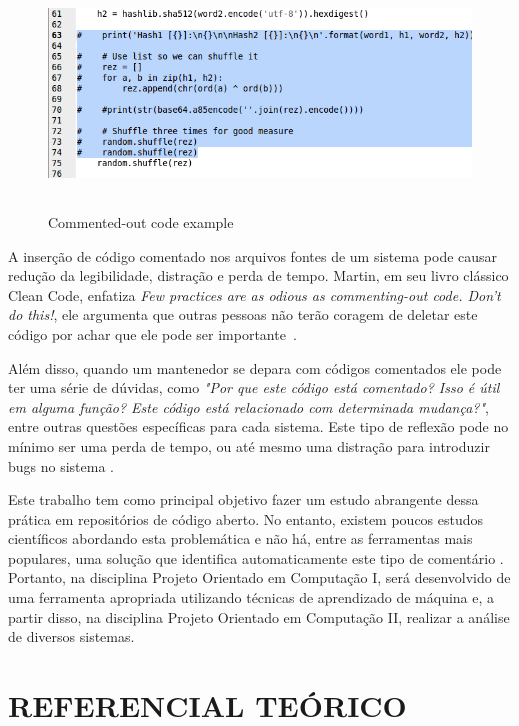 \documentclass{abnt}
\begin{document}
\begin{figure}[h!]
  \centering
  \includegraphics[height=2.4in,width=6.3in]{images/gcc06.png}
  \caption{Commented-out code example }
  \label{fig:commentExample}
\end{figure}


A inserção de código comentado nos arquivos fontes de um sistema pode causar
redução da legibilidade, distração e perda de tempo. Martin, em seu livro clássico
Clean Code, enfatiza \textit{Few practices are as odious as commenting-out code. 
Don’t do this!}, ele argumenta que outras pessoas não terão coragem de deletar 
este código por achar que ele pode ser importante~\cite{cleanCode}. 

Além disso, quando um mantenedor se depara com códigos comentados ele pode ter uma 
série de dúvidas, como \textit{"Por que este código está comentado? Isso é útil em 
alguma função? Este código está relacionado com determinada mudança?"}, entre outras 
questões específicas para cada sistema. Este tipo de reflexão pode no mínimo ser 
uma perda de tempo, ou até mesmo uma distração para introduzir bugs no sistema \cite{cleanCode}.

Este trabalho tem como principal objetivo fazer um estudo abrangente dessa prática em repositórios 
de código aberto. No entanto, existem poucos estudos científicos abordando esta problemática e não 
há, entre as ferramentas mais populares, uma solução que identifica automaticamente
este tipo de comentário \cite{articleMiningComments}. Portanto, na disciplina Projeto Orientado
em Computação I, será desenvolvido de uma ferramenta apropriada utilizando técnicas de aprendizado de 
máquina e, a partir disso, na disciplina Projeto Orientado em Computação II, realizar a análise de
diversos sistemas. 


\chapter{REFERENCIAL TEÓRICO}
\end{document}
